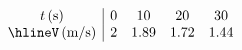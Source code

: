 \documentclass[preview]{standalone}
\begin{document}
\begin{align*}
\begin{array}{c|cccc}t \, (\text{s}) & 0 & 10 & 20 & 30 \\\hlineV \, (\text{m/s}) & 2 & 1.89 & 1.72 & 1.44\end{array}
\end{align*}
\end{document}
